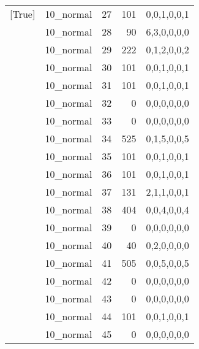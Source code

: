 \begin{tabular}{llrrl}
 [True]          & 10\_normal           &            27 &                   101 & 0,0,1,0,0,1   \\
 [True]          & 10\_normal           &            28 &                    90 & 6,3,0,0,0,0   \\
 [True]          & 10\_normal           &            29 &                   222 & 0,1,2,0,0,2   \\
 [True]          & 10\_normal           &            30 &                   101 & 0,0,1,0,0,1   \\
 [True]          & 10\_normal           &            31 &                   101 & 0,0,1,0,0,1   \\
 [True]          & 10\_normal           &            32 &                     0 & 0,0,0,0,0,0   \\
 [True]          & 10\_normal           &            33 &                     0 & 0,0,0,0,0,0   \\
 [True]          & 10\_normal           &            34 &                   525 & 0,1,5,0,0,5   \\
 [True]          & 10\_normal           &            35 &                   101 & 0,0,1,0,0,1   \\
 [True]          & 10\_normal           &            36 &                   101 & 0,0,1,0,0,1   \\
 [True]          & 10\_normal           &            37 &                   131 & 2,1,1,0,0,1   \\
 [True]          & 10\_normal           &            38 &                   404 & 0,0,4,0,0,4   \\
 [True]          & 10\_normal           &            39 &                     0 & 0,0,0,0,0,0   \\
 [True]          & 10\_normal           &            40 &                    40 & 0,2,0,0,0,0   \\
 [True]          & 10\_normal           &            41 &                   505 & 0,0,5,0,0,5   \\
 [True]          & 10\_normal           &            42 &                     0 & 0,0,0,0,0,0   \\
 [True]          & 10\_normal           &            43 &                     0 & 0,0,0,0,0,0   \\
 [True]          & 10\_normal           &            44 &                   101 & 0,0,1,0,0,1   \\
 [True]          & 10\_normal           &            45 &                     0 & 0,0,0,0,0,0   \\

\end{tabular}
